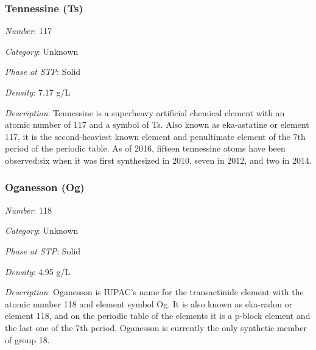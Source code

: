 \documentclass{article}
\begin{document}
\hypertarget{subsubsection::Ts}{}\subsubsection{Tennessine (Ts)}

\textit{Number}: 117

\textit{Category}: Unknown

\textit{Phase at STP}: Solid

\textit{Density}: 7.17 g/L

\textit{Description}: Tennessine is a superheavy artificial chemical element with an atomic number of 117 and a symbol of Ts. Also known as eka-astatine or element 117, it is the second-heaviest known element and penultimate element of the 7th period of the periodic table. As of 2016, fifteen tennessine atoms have been observed:six when it was first synthesized in 2010, seven in 2012, and two in 2014.

\hypertarget{subsubsection::Og}{}\subsubsection{Oganesson (Og)}

\textit{Number}: 118

\textit{Category}: Unknown

\textit{Phase at STP}: Solid

\textit{Density}: 4.95 g/L

\textit{Description}: Oganesson is IUPAC's name for the transactinide element with the atomic number 118 and element symbol Og. It is also known as eka-radon or element 118, and on the periodic table of the elements it is a p-block element and the last one of the 7th period. Oganesson is currently the only synthetic member of group 18.
\end{document}
